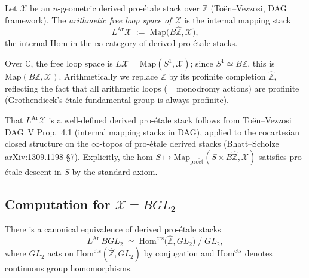 \begin{definition}
\label{v4-arith:bzn:def:L-ar}
Let \(\mathcal{X}\) be an \(n\)-geometric derived pro-\'etale stack
over \(\mathbb{Z}\) (To\"en--Vezzosi, DAG framework). The
\emph{arithmetic free loop space of \(\mathcal{X}\)} is the internal
mapping stack
\begin{equation}
\label{v4-arith:bzn:eq:L-ar-def}
L^{\mathrm{Ar}}\mathcal{X}\;:=\;\mathrm{Map}\bigl(B\widehat{\mathbb{Z}},\mathcal{X}\bigr),
\end{equation}
the internal Hom in the \(\infty\)-category of derived pro-\'etale
stacks.
\end{definition}

\begin{remark}
\label{v4-arith:bzn:rem:L-ar-vs-LC}
Over \(\mathbb{C}\), the free loop space is \(L\mathcal{X}=\mathrm{Map}(S^{1},\mathcal{X})\);
since \(S^{1}\simeq B\mathbb{Z}\), this is \(\mathrm{Map}(B\mathbb{Z},\mathcal{X})\).
Arithmetically we replace \(\mathbb{Z}\) by its profinite completion
\(\widehat{\mathbb{Z}}\), reflecting the fact that all arithmetic
loops (= monodromy actions) are profinite (Grothendieck's
\'etale fundamental group is always profinite).
\end{remark}

\begin{remark}
\label{v4-arith:bzn:rem:L-ar-existence}
That \(L^{\mathrm{Ar}}\mathcal{X}\) is a well-defined derived
pro-\'etale stack follows from To\"en--Vezzosi DAG~V
Prop.~4.1 (internal mapping stacks in DAG), applied to the
cocartesian closed structure on the \(\infty\)-topos of pro-\'etale
derived stacks (Bhatt--Scholze arXiv:1309.1198 \S7). Explicitly,
the hom \(S\mapsto\mathrm{Map}_{\mathrm{pro\acute{e}t}}(S\times B\widehat{\mathbb{Z}},\mathcal{X})\)
satisfies pro-\'etale descent in \(S\) by the standard axiom.
\end{remark}

\subsection{Computation for \(\mathcal{X}=BGL_{2}\)}

\begin{proposition}
\label{v4-arith:bzn:prop:L-ar-BGL2}
There is a canonical equivalence of
derived pro-\'etale stacks
\begin{equation}
\label{v4-arith:bzn:eq:L-ar-BGL2}
L^{\mathrm{Ar}}\,BGL_{2}\;\simeq\;\mathrm{Hom}^{\mathrm{cts}}\bigl(\widehat{\mathbb{Z}},GL_{2}\bigr)\;/\;GL_{2},
\end{equation}
where \(GL_{2}\) acts on \(\mathrm{Hom}^{\mathrm{cts}}(\widehat{\mathbb{Z}},GL_{2})\)
by conjugation and \(\mathrm{Hom}^{\mathrm{cts}}\) denotes continuous
group homomorphisms.
\end{proposition}

